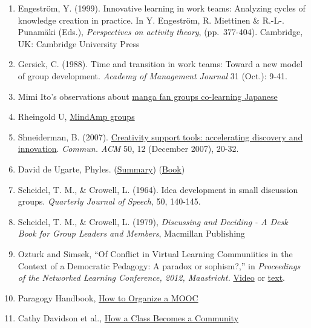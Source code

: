 \begin{enumerate}
\def\labelenumi{\arabic{enumi}.}
\item
  Engeström, Y. (1999). Innovative learning in work teams: Analyzing
  cycles of knowledge creation in practice. In Y. Engeström, R.
  Miettinen \& R.-L-. Punamäki (Eds.), \emph{Perspectives on activity
  theory}, (pp.~377-404). Cambridge, UK: Cambridge University Press
\item
  Gersick, C. (1988). Time and transition in work teams: Toward a new
  model of group development. \emph{Academy of Management Journal} 31
  (Oct.): 9-41.
\item
  Mimi Ito's observations about
  \href{http://mitpress.mit.edu/books/full_pdfs/hanging_out.pdf}{manga
  fan groups co-learning Japanese}
\item
  Rheingold U,
  \href{http://socialmediaclassroom.com/host/mindamp5/lockedwiki/main-page}{MindAmp
  groups}
\item
  Shneiderman, B. (2007).
  \href{http://doi.acm.org/10.1145/1323688.1323689}{Creativity support
  tools: accelerating discovery and innovation}. \emph{Commun. ACM} 50,
  12 (December 2007), 20-32.
\item
  David de Ugarte, Phyles.
  (\href{http://david.lasindias.com/phyles/}{Summary})
  (\href{http://deugarte.com/gomi/phyles.pdf}{Book})
\item
  Scheidel, T. M., \& Crowell, L. (1964). Idea development in small
  discussion groups. \emph{Quarterly Journal of Speech}, 50, 140-145.
\item
  Scheidel, T. M., \& Crowell, L. (1979), \emph{Discussing and Deciding
  - A Desk Book for Group Leaders and Members}, Macmillan Publishing
\item
  Ozturk and Simsek, ``Of Conflict in Virtual Learning Communiities in
  the Context of a Democratic Pedagogy: A paradox or sophism?,'' in
  \emph{Proceedings of the Networked Learning Conference, 2012,
  Maastricht.}
  \href{http://www.google.com/search?client=chrome-mobile\&sourceid=chrome-mobile\&ie=UTF-8\&q=Of+Conflict+in+Virtual+Learning+Communiities+in+the+Context+of+a+Democratic+Pedagogy}{Video}
  or
  \href{http://networkedlearningconference.org.uk/abstracts/pdf/ozturk.pdf}{text}.
\item
  Paragogy Handbook,
  \href{http://peeragogy.org/organizing-a-learning-context/connectivism-in-practice-how-to-organize-a-mooc/}{How
  to Organize a MOOC}
\item
  Cathy Davidson et al.,
  \href{http://news.rapgenius.com/Cathy-davidson-how-a-class-becomes-a-community-theory-method-examples-chapter-one-lyrics}{How
  a Class Becomes a Community}
\end{enumerate}

